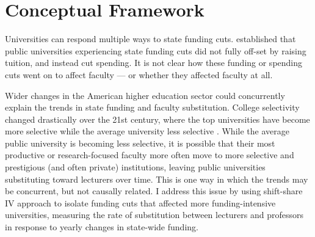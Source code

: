 \section{Conceptual Framework}
\label{sec:conceptual}

Universities can respond multiple ways to state funding cuts.
\cite{NBERw23736} established that public universities experiencing state funding cuts did not fully off-set by raising tuition, and instead cut spending.
It is not clear how these funding or spending cuts went on to affect faculty --- or whether they affected faculty at all.

Wider changes in the American higher education sector could concurrently explain the trends in state funding and faculty substitution.
College selectivity changed drastically over the 21st century, where the top universities have become more selective while the average university less selective \citep{hoxby2009changing}.
While the average public university is becoming less selective, it is possible that their most productive or research-focused faculty more often move to more selective and prestigious (and often private) institutions, leaving public universities substituting toward lecturers over time.
This is one way in which the trends may be concurrent, but not causally related.
I address this issue by using shift-share IV approach to isolate funding cuts that affected more funding-intensive universities, measuring the rate of substitution between lecturers and professors in response to yearly changes in state-wide funding.

